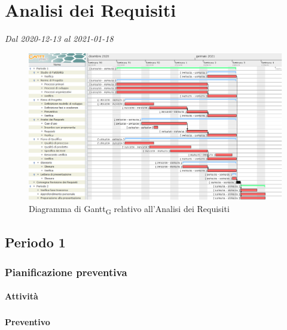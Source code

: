 \section{Analisi dei Requisiti}
\textit{Dal 2020-12-13 al 2021-01-18}


\begin{figure}[H]
	\centering
	\includegraphics[scale=0.43]{res/images/gantt_fase/02_gantt_analisi_requisiti.png}
	\caption{Diagramma di Gantt\textsubscript{G} relativo all'Analisi dei Requisiti}
\end{figure}


\subsection{Periodo 1}

\subsubsection{Pianificazione preventiva}

\paragraph{Attività}
\subparagraph*{}

\planningTable{
	
}


\paragraph{Preventivo}
\subparagraph*{}


